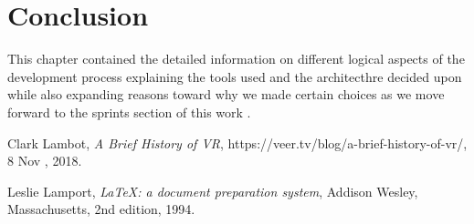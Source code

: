 \documentclass[]{report}
\begin{document}
\section{Conclusion}

This chapter contained the detailed information on different logical aspects of the development process explaining the tools used and the architecthre decided upon while also expanding reasons toward why we made certain choices as we move forward to the sprints section of this work .

\begin{thebibliography}{9}
	
	Clark Lambot,
	\textit{A Brief History of VR},
	https://veer.tv/blog/a-brief-history-of-vr/,
	8 Nov , 2018.
	
	Leslie Lamport,
	\textit{\LaTeX: a document preparation system},
	Addison Wesley, Massachusetts,
	2nd edition,
	1994.
	
\end{thebibliography}
\end{document}
